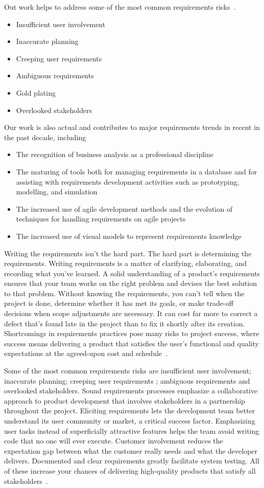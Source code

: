 \documentclass[dissertation,final]{softeng}
\begin{document}
Out work helps to address some of the most common requirements risks~\citep[p. 20]{Wiegers2013}.
\begin{itemize}
\item Insufficient user involvement
\item Inaccurate planning
\item Creeping user requirements
\item Ambiguous requirements
\item Gold plating
\item Overlooked stakeholders
\end{itemize}
\appendix
Our work is also actual and contributes to major requirements trends in recent in the past decade, including
\begin{itemize}
\item The recognition of business analysis as a professional discipline
\item The maturing of tools both for managing requirements in a database and for assisting with requirements development activities such as prototyping, modelling, and simulation
\item The increased use of agile development methods and the evolution of techniques for handling requirements on agile projects
\item The increased use of visual models to represent requirements knowledge
\end{itemize}

Writing the requirements isn't the hard part. The hard part is determining the requirements. Writing requirements is a matter of clarifying, elaborating, and recording what you've learned. A solid understanding of a product's requirements ensures that your team works on the right problem and devises the best solution to that problem. Without knowing the requirements, you can't tell when the project is done, determine whether it has met its goals, or make trade-off decisions when scope adjustments are necessary. It can cost far more to correct a defect that's found late in the project than to fix it shortly after its creation. Shortcomings in requirements practices pose many risks to project success, where success means delivering a product that satisfies the user's functional and quality expectations at the agreed-upon cost and schedule~\citep{Wiegers2013}.

Some of the most common requirements risks are insufficient user involvement; inaccurate planning; creeping user requirements ; ambiguous requirements and overlooked stakeholders. Sound requirements processes emphasize a collaborative approach to product development that involves stakeholders in a partnership throughout the project. Eliciting requirements lets the development team better understand its user community or market, a critical success factor. Emphasizing user tasks instead of superficially attractive features helps the team avoid writing code that no one will ever execute. Customer involvement reduces the expectation gap between what the customer really needs and what the developer delivers. Documented and clear requirements greatly facilitate system testing. All of these increase your chances of delivering high-quality products that satisfy all stakeholders~\citep{Wiegers2013}.
\end{document}
